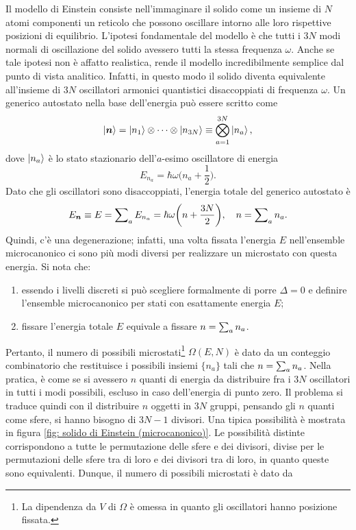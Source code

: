 Il modello di Einstein consiste nell'immaginare il solido come un insieme di $N$ atomi componenti un reticolo che possono oscillare intorno alle loro rispettive posizioni di equilibrio. L'ipotesi fondamentale del modello è che tutti i $3N$ modi normali di oscillazione del solido avessero tutti la stessa frequenza $\omega$. Anche se tale ipotesi non è affatto realistica, rende il modello incredibilmente semplice dal punto di vista analitico. Infatti, in questo modo il solido diventa equivalente all'insieme di $3N$ oscillatori armonici quantistici disaccoppiati di frequenza $\omega$. Un generico autostato nella base dell'energia può essere scritto come 
\begin{equation}
    \ket{\bm{n}} = \ket{n_1} \otimes \cdots \otimes \ket{n_{3N}} \equiv \bigotimes_{a=1}^{3N}\ket{n_a},
\end{equation}
dove $\ket{n_a}$ è lo stato stazionario dell'$a$-esimo oscillatore di energia
\begin{equation}
    E_{n_a} = \hbar\omega\bigg(n_a + \frac{1}{2}\bigg).
\end{equation}
Dato che gli oscillatori sono disaccoppiati, l'energia totale del generico autostato è
\begin{equation}
    E_{\bm{n}} \equiv E = \sum\nolimits_a E_{n_a} = \hbar\omega\bigg(n + \frac{3N}{2}\bigg),\quad n = \sum\nolimits_an_a.
\end{equation}
Quindi, c'è una degenerazione; infatti, una volta fissata l'energia $E$ nell'ensemble microcanonico ci sono più modi diversi per realizzare un microstato con questa energia. Si nota che:
\begin{enumerate}
    \item essendo i livelli discreti si può scegliere formalmente di porre $\Delta = 0$ e definire l'ensemble microcanonico per stati con esattamente energia $E$;
    \item fissare l'energia totale $E$ equivale a fissare $n = \sum\nolimits_an_a$.
\end{enumerate}
Pertanto, il numero di possibili microstati\footnote{La dipendenza da $V$ di $\Omega$ è omessa in quanto gli oscillatori hanno posizione fissata.} $\Omega(E,N)$ è dato da un conteggio combinatorio che restituisce i possibili insiemi $\{n_a\}$ tali che $n = \sum\nolimits_an_a$. Nella pratica, è come se si avessero $n$ quanti di energia da distribuire fra i $3N$ oscillatori in tutti i modi possibili, escluso in caso dell'energia di punto zero. Il problema si traduce quindi con il distribuire $n$ oggetti in $3N$ gruppi, pensando gli $n$ quanti come sfere, si hanno bisogno di $3N - 1$ divisori. Una tipica possibilità è mostrata in figura \ref{fig: solido di Einstein (microcanonico)}. Le possibilità distinte corrispondono a tutte le permutazione delle sfere e dei divisori, divise per le permutazioni delle sfere tra di loro e dei divisori tra di loro, in quanto queste sono equivalenti. Dunque, il numero di possibili microstati è dato da

